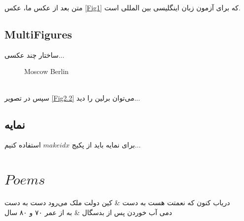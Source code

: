 \documentclass{book}
\begin{document}
متن بعد از عکس ما، عکس \ref{Fig1}
که برای آزمون زبان اینگلیسی بین المللی است.
\vspace*{3cm}

\section{MultiFigures}
ساختار چند عکسی...
\begin{figure}[h!]
	\begin{center}
	\hspace*{1cm}
	\end{center}
	\caption{ Moscow  Berlin}
\end{figure}
\\
سپس در تصویر \ref{Fig2.2}
می‌توان برلین را دید...
\section{نمایه}
برای نمایه باید از پکیج $ makeidx$
استفاده کنیم...
\chapter{$Poems$}

\begin{traditionalpoem}
	دریاب کنون که نعمتت هست به دست & 
	کین دولت ملک می‌رود دست به دست \\
	دمی آب خوردن پس از بدسگال &
	به از عمر ۷۰ و ۸۰ سال \\

\end{traditionalpoem}
\end{document}
